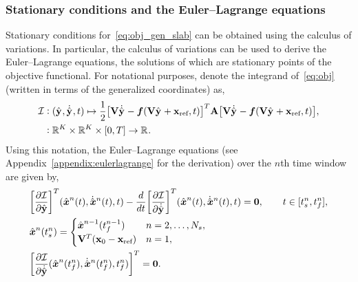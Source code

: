 \subsubsection{Stationary conditions and the Euler--Lagrange equations}
Stationary conditions for~\eqref{eq:obj_gen_slab} can be obtained using the
calculus of variations. In particular, the calculus of variations can be used
to derive the Euler--Lagrange equations, the solutions of which are stationary 
points of the objective functional. For notational purposes, denote the
integrand of~\eqref{eq:obj} (written in terms of the generalized
coordinates) as, 
\begin{equation}\label{eq:integrand}
\begin{split}
 \minintegrandArg{n} & \vcentcolon
(\genstateyDiscreteArgnt{}, \genstateyDiscreteDotArgnt{},t) \mapsto \frac{1}{2} \big[
\basisspace \genstateyDiscreteDotArgnt{} - \velocity(\basisspace \genstateyDiscreteArgnt{}
+ \stateIntercept,t) \big]^T \stweightingMatArgt{n}{t} \big[
\basisspace \genstateyDiscreteDotArgnt{}  - \velocity(\basisspace \genstateyDiscreteArgnt{} +
\stateIntercept,t) \big], \\ & \vcentcolon \RR{\romdim} \times \RR{\romdim} \times [0,T]
 \rightarrow \RR{} .  
\end{split}
\end{equation}
Using this notation, the Euler--Lagrange equations (see
Appendix~\ref{appendix:eulerlagrange} for the derivation) over the $n$th
time window are given by, 
\begin{equation}\label{eq:el1} 
\begin{split}
& \bigg[\frac{\partial
\minintegrandArg{n}}{\partial
\genstateyDiscrete}\bigg]^T (\genstateArg{n}{t},\genstateDotArg{n}{t},t) - \frac{d}{dt}
\bigg[ \frac{\partial \minintegrandArg{n}}{\partial \genstateyDiscreteDotArgnt{}} \bigg]^T
(\genstateArg{n}{t},\genstateDotArg{n}{t} ,t) = \bz, \qquad t \in [\timeStartArg{n},\timeEndArg{n}],\\ 
&\genstate^n(\timeStartArg{n})  = \begin{cases} 
\genstate^{n-1}(\timeEndArg{n-1}) &
n=2,\ldots,\nslabs, \\ 
\basisspace^T(\stateFOMIC - \stateIntercept) & n=1,
\end{cases}\\ 
&\bigg[ \frac{\partial \minintegrandArg{n}}{\partial \genstateyDiscreteDotArgnt{}}(\genstateArg{n}{\timeEndArg{n}},\genstateDotArg{n}{\timeEndArg{n}},\timeEndArg{n})\bigg]^T =
\bz.\end{split} 
\end{equation}
